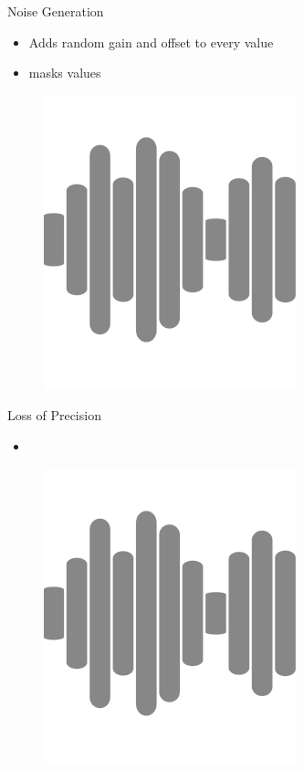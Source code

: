 \documentclass[aspectratio=169]{beamer}
[aspectratio=169] %
\begin{document}
\begin{frame}{Noise Generation}
  \begin{minipage}{0.49\textwidth} 
    \begin{itemize}
      \item Adds random gain and offset to every value
      \item masks values
    \end{itemize}
  \end{minipage}
  \hfill
  \begin{minipage}{0.49\textwidth} 
    \begin{figure}
      \centering
      \includegraphics[height=0.5\textheight]{figures/noise.png}
    \end{figure}
  \end{minipage}
\end{frame}

\begin{frame}{Loss of Precision}
  \begin{minipage}{0.49\textwidth} 
    \begin{itemize}
      \item 
    \end{itemize}
  \end{minipage}
  \hfill
  \begin{minipage}{0.49\textwidth} 
    \begin{figure}
      \centering
      \includegraphics[height=0.5\textheight]{figures/noise.png}
    \end{figure}
  \end{minipage}
\end{frame}
\end{document}
